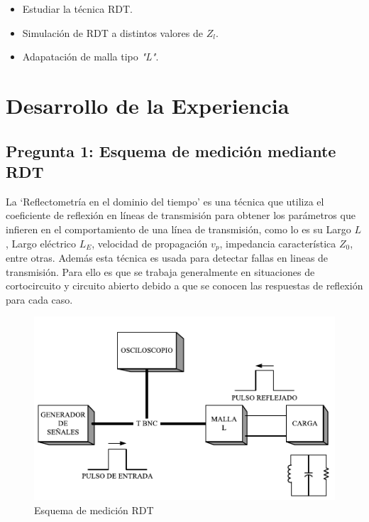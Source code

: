 \documentclass[11pt,onecolumn]{article}
\begin{document}
\begin{itemize}
\item Estudiar la técnica RDT.
\item Simulación de RDT a distintos valores de $Z_l$. 
\item Adapatación de malla tipo \textit{"L"}.
\end{itemize}



\newpage
\section{Desarrollo de la Experiencia}

\subsection{Pregunta 1: Esquema de medición mediante RDT}

La `Reflectometría en el dominio del tiempo' es una técnica que  utiliza el coeficiente de reflexión en líneas de transmisión para obtener los parámetros que infieren en el comportamiento de una línea de transmisión, como lo es su Largo $L$, Largo eléctrico $L_{E}$, velocidad de propagación $v_{p}$, impedancia característica $Z_{0}$, entre otras. Además esta técnica es usada para detectar fallas en lineas de transmisión. Para ello es que se trabaja generalmente en situaciones de cortocircuito y circuito abierto debido a que se conocen las respuestas de reflexión para cada caso.

\begin{figure}
  \begin{center}
    \includegraphics[scale = 1]{img/schema.pdf}
  \end{center}
  \caption{Esquema de medición RDT}
  \label{fig:schrdt}
\end{figure}
\end{document}
